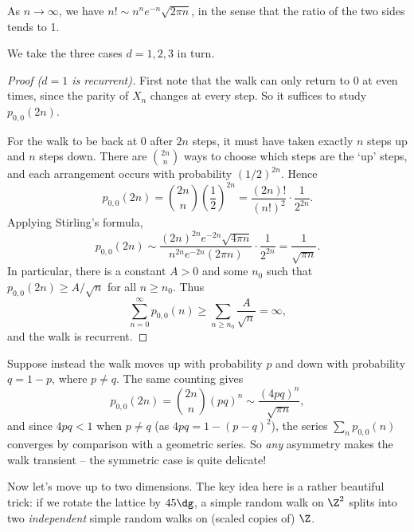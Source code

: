 \begin{fact}
	As $n \rightarrow \infty$, we have $n! \sim n^n e^{-n} \sqrt{2 \pi n}$, in the sense that the ratio of the two sides tends to 1.
\end{fact}

We take the three cases $d = 1, 2, 3$ in turn.

\begin{proof}[Proof ($d = 1$ is recurrent)]
	First note that the walk can only return to 0 at even times, since the parity of $X_n$ changes at every step. So it suffices to study $p_{0, 0}(2n)$.

	For the walk to be back at 0 after $2n$ steps, it must have taken exactly $n$ steps up and $n$ steps down. There are $\binom{2n}{n}$ ways to choose which steps are the `up' steps, and each arrangement occurs with probability $(1/2)^{2n}$. Hence
	$$
	p_{0, 0}(2n) = \binom{2n}{n} \left(\frac{1}{2}\right)^{2n} = \frac{(2n)!}{(n!)^2} \cdot \frac{1}{2^{2n}}.
	$$
	Applying Stirling's formula,
	$$
	p_{0, 0}(2n) \sim \frac{(2n)^{2n} e^{-2n}\sqrt{4 \pi n}}{n^{2n} e^{-2n} (2 \pi n)} \cdot \frac{1}{2^{2n}} = \frac{1}{\sqrt{\pi n}}.
	$$
	In particular, there is a constant $A > 0$ and some $n_0$ such that $p_{0, 0}(2n) \geq A/\sqrt{n}$ for all $n \geq n_0$. Thus
	$$
	\sum_{n = 0}^{\infty} p_{0, 0}(n) \geq \sum_{n \geq n_0} \frac{A}{\sqrt{n}} = \infty,
	$$
	and the walk is recurrent.
\end{proof}

\begin{remark}
	Suppose instead the walk moves up with probability $p$ and down with probability $q = 1 - p$, where $p \neq q$. The same counting gives
	$$
	p_{0, 0}(2n) = \binom{2n}{n} (pq)^n \sim \frac{(4pq)^n}{\sqrt{\pi n}},
	$$
	and since $4pq < 1$ when $p \neq q$ (as $4pq = 1 - (p - q)^2$), the series $\sum_n p_{0,0}(n)$ converges by comparison with a geometric series. So \emph{any} asymmetry makes the walk transient -- the symmetric case is quite delicate!
\end{remark}

Now let's move up to two dimensions. The key idea here is a rather beautiful trick: if we rotate the lattice by $45\dg$, a simple random walk on $\Z^2$ splits into two \emph{independent} simple random walks on (scaled copies of) $\Z$.

